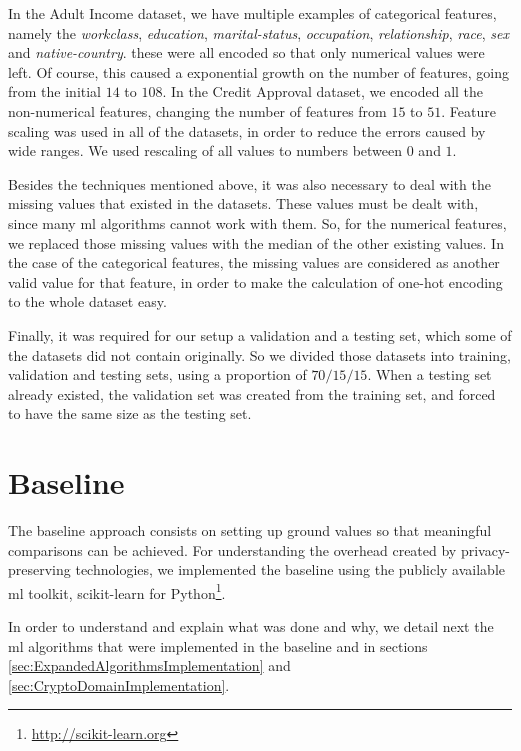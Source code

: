In the Adult Income dataset, we have multiple examples of categorical features, namely the \textit{workclass}, \textit{education}, \textit{marital-status}, \textit{occupation}, \textit{relationship}, \textit{race}, \textit{sex} and \textit{native-country}. these were all encoded so that only numerical values were left. Of course, this caused a exponential growth on the number of features, going from the initial $14$ to $108$.
In the Credit Approval dataset, we encoded all the non-numerical features, changing the number of features from $15$ to $51$.
Feature scaling was used in all of the datasets, in order to reduce the errors caused by wide ranges. We used rescaling of all values to numbers between $0$ and $1$.

Besides the techniques mentioned above, it was also necessary to deal with the missing values that existed in the datasets. These values must be dealt with, since many \ac{ml} algorithms cannot work with them. So, for the numerical features, we replaced those missing values with the median of the other existing values. In the case of the categorical features, the missing values are considered as another valid value for that feature, in order to make the calculation of one-hot encoding to the whole dataset easy. 

Finally, it was required for our setup a validation and a testing set, which some of the datasets did not contain originally. So we divided those datasets into training, validation and testing sets, using a proportion of $70/15/15$. When a testing set already existed, the validation set was created from the training set, and forced to have the same size as the testing set.


\section{Baseline}
\label{sec:BaselineImplementation}

The baseline approach consists on setting up ground values so that meaningful comparisons can be achieved. For understanding the overhead created by privacy-preserving technologies, we implemented the baseline using the publicly available \ac{ml} toolkit, scikit-learn for Python\footnote{\url{http://scikit-learn.org}}.

In order to understand and explain what was done and why, we detail next the \ac{ml} algorithms that were implemented in the baseline and in sections \ref{sec:ExpandedAlgorithmsImplementation} and \ref{sec:CryptoDomainImplementation}.

